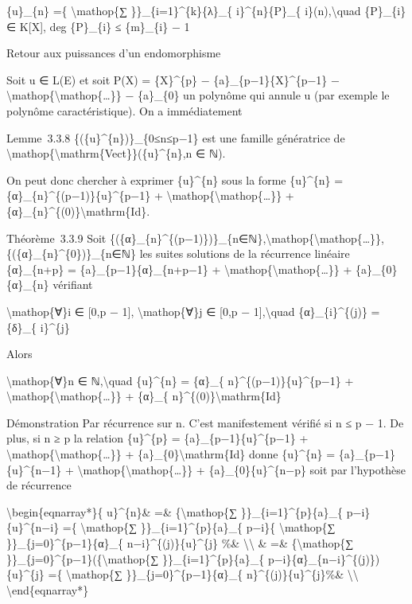 \documentclass[]{article}
\begin{document}
\{u\}\_\{n\} =\{ \textbackslash{}mathop\{∑
\}\}\_\{i=1\}\^{}\{k\}\{λ\}\_\{ i\}\^{}\{n\}\{P\}\_\{
i\}(n),\textbackslash{}quad \{P\}\_\{i\} ∈ K{[}X{]}, deg \{P\}\_\{i\} ≤
\{m\}\_\{i\} − 1

Retour aux puissances d'un endomorphisme

Soit u ∈ L(E) et soit P(X) = \{X\}\^{}\{p\} −
\{a\}\_\{p−1\}\{X\}\^{}\{p−1\}
−\textbackslash{}mathop\{\textbackslash{}mathop\{\ldots{}\}\} −
\{a\}\_\{0\} un polynôme qui annule u (par exemple le polynôme
caractéristique). On a immédiatement

Lemme~3.3.8 \{(\{u\}\^{}\{n\})\}\_\{0≤n≤p−1\} est une famille
génératrice de
\textbackslash{}mathop\{\textbackslash{}mathrm\{Vect\}\}(\{u\}\^{}\{n\},n
∈ ℕ).

On peut donc chercher à exprimer \{u\}\^{}\{n\} sous la forme
\{u\}\^{}\{n\} = \{α\}\_\{n\}\^{}\{(p−1)\}\{u\}\^{}\{p−1\} +
\textbackslash{}mathop\{\textbackslash{}mathop\{\ldots{}\}\} +
\{α\}\_\{n\}\^{}\{(0)\}\textbackslash{}mathrm\{Id\}.

Théorème~3.3.9 Soit
\{(\{α\}\_\{n\}\^{}\{(p−1)\})\}\_\{n∈ℕ\},\textbackslash{}mathop\{\textbackslash{}mathop\{\ldots{}\}\},\{(\{α\}\_\{n\}\^{}\{0\})\}\_\{n∈ℕ\}
les suites solutions de la récurrence linéaire \{α\}\_\{n+p\} =
\{a\}\_\{p−1\}\{α\}\_\{n+p−1\} +
\textbackslash{}mathop\{\textbackslash{}mathop\{\ldots{}\}\} +
\{a\}\_\{0\}\{α\}\_\{n\} vérifiant

\textbackslash{}mathop\{∀\}i ∈ {[}0,p − 1{]},
\textbackslash{}mathop\{∀\}j ∈ {[}0,p − 1{]},\textbackslash{}quad
\{α\}\_\{i\}\^{}\{(j)\} = \{δ\}\_\{ i\}\^{}\{j\}

Alors

\textbackslash{}mathop\{∀\}n ∈ ℕ,\textbackslash{}quad \{u\}\^{}\{n\} =
\{α\}\_\{ n\}\^{}\{(p−1)\}\{u\}\^{}\{p−1\} +
\textbackslash{}mathop\{\textbackslash{}mathop\{\ldots{}\}\} + \{α\}\_\{
n\}\^{}\{(0)\}\textbackslash{}mathrm\{Id\}

Démonstration Par récurrence sur n. C'est manifestement vérifié si n ≤ p
− 1. De plus, si n ≥ p la relation \{u\}\^{}\{p\} =
\{a\}\_\{p−1\}\{u\}\^{}\{p−1\} +
\textbackslash{}mathop\{\textbackslash{}mathop\{\ldots{}\}\} +
\{a\}\_\{0\}\textbackslash{}mathrm\{Id\} donne \{u\}\^{}\{n\} =
\{a\}\_\{p−1\}\{u\}\^{}\{n−1\} +
\textbackslash{}mathop\{\textbackslash{}mathop\{\ldots{}\}\} +
\{a\}\_\{0\}\{u\}\^{}\{n−p\} soit par l'hypothèse de récurrence

\textbackslash{}begin\{eqnarray*\}\{ u\}\^{}\{n\}\& =\&
\{\textbackslash{}mathop\{∑ \}\}\_\{i=1\}\^{}\{p\}\{a\}\_\{
p−i\}\{u\}\^{}\{n−i\} =\{ \textbackslash{}mathop\{∑
\}\}\_\{i=1\}\^{}\{p\}\{a\}\_\{ p−i\}\{ \textbackslash{}mathop\{∑
\}\}\_\{j=0\}\^{}\{p−1\}\{α\}\_\{ n−i\}\^{}\{(j)\}\{u\}\^{}\{j\} \%\&
\textbackslash{}\textbackslash{} \& =\& \{\textbackslash{}mathop\{∑
\}\}\_\{j=0\}\^{}\{p−1\}(\{\textbackslash{}mathop\{∑
\}\}\_\{i=1\}\^{}\{p\}\{a\}\_\{
p−i\}\{α\}\_\{n−i\}\^{}\{(j)\})\{u\}\^{}\{j\} =\{
\textbackslash{}mathop\{∑ \}\}\_\{j=0\}\^{}\{p−1\}\{α\}\_\{
n\}\^{}\{(j)\}\{u\}\^{}\{j\}\%\& \textbackslash{}\textbackslash{}
\textbackslash{}end\{eqnarray*\}
\end{document}

